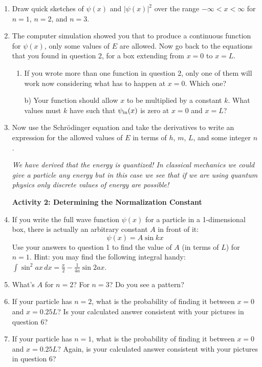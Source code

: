 \begin{enumerate}
\item Draw quick sketches of $\psi(x)$ and $|\psi(x)|^2$ over the range $-\infty<x<\infty$ for $n=1$, $n=2$, and $n=3$.
\answerspace{2.8in}

\item The computer simulation showed you that to produce a continuous function for $\psi(x)$, only some values of $E$ are allowed. Now go back to the equations that you found in question 2, for a box extending from $x=0$ to $x=L$.  
\begin{enumerate}
\item If you wrote more than one function in question 2, only one of them will work now considering what has to happen at $x=0$.  Which one?
\answerspace{0.3in}

b) Your function should allow $x$ to be multiplied by a constant $k$.  What values must $k$ have such that $\psi_{\rm in}(x)$ is zero at $x=0$ and $x=L$?  
\answerspace{0.3in}
\end{enumerate}

\item Now use the Schr\"odinger equation and take the derivatives to write an expression for the allowed values of $E$ in terms of $h$, $m$, $L$, and some integer $n$.  
\answerspace{1.5in}

\textit{We have derived that the energy is quantized!  In classical mechanics we could give a particle any energy but in this case we see that if we are using quantum physics only discrete values of energy are possible!}

\pagebreak[3]

\textbf{Activity 2: Determining the Normalization Constant}

\item If you write the full wave function $\psi(x)$ for a particle in a 1-dimensional box, there is actually an arbitrary constant $A$ in front of it:
$$\psi(x)=A\sin kx$$
Use your answers to question 1 to find the value of $A$ (in terms of $L$) for $n=1$.  
Hint: you may find the following integral handy: $\int \sin^2ax \, dx = \frac{x}{2} -\frac{1}{4a}\sin 2ax $.
\answerspace{1.7in}

\item What's $A$ for $n=2$?  For $n=3$?  Do you see a pattern?
\answerspace{1.7in}

\item If your particle has $n=2$, what is the probability of finding it between $x=0$ and $x=0.25L$?  Is your calculated answer consistent with your pictures in question 6?
\answerspace{1.5in}

\item If your particle has $n=1$, what is the probability of finding it between $x=0$ and $x=0.25L$?  Again, is your calculated answer consistent with your pictures in question 6?
\answerspace{1.5in}

\end{enumerate}



